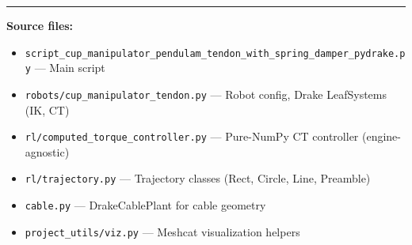 \documentclass[11pt,a4paper]{article}
\begin{document}
\vfill
\noindent\rule{\linewidth}{0.4pt}
\begin{small}
\textbf{Source files:}
\begin{itemize}[leftmargin=2em, topsep=2pt, itemsep=1pt]
    \item \texttt{script\_cup\_manipulator\_pendulam\_tendon\_with\_spring\_damper\_pydrake.py} --- Main script
    \item \texttt{robots/cup\_manipulator\_tendon.py} --- Robot config, Drake LeafSystems (IK, CT)
    \item \texttt{rl/computed\_torque\_controller.py} --- Pure-NumPy CT controller (engine-agnostic)
    \item \texttt{rl/trajectory.py} --- Trajectory classes (Rect, Circle, Line, Preamble)
    \item \texttt{cable.py} --- DrakeCablePlant for cable geometry
    \item \texttt{project\_utils/viz.py} --- Meshcat visualization helpers
\end{itemize}
\end{small}
\end{document}
